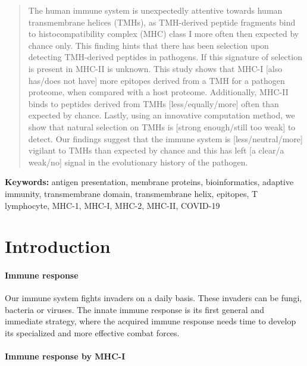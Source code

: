 \begin{abstract}

The human immune system is unexpectedly attentive towards
human transmembrane helices (TMHs), as TMH-derived peptide fragments
bind to histocompatibility complex (MHC) class I more often then expected
by chance only.
This finding hints that there has been selection upon detecting TMH-derived
peptides in pathogens.
If this signature of selection is present in MHC-II is unknown.
This study shows that MHC-I [also has/does not have] more
epitopes derived from a TMH for a pathogen proteome, when compared with
a host proteome.
Additionally, MHC-II binds to peptides derived from TMHs 
[less/equally/more] often than expected by chance.
Lastly, using an innovative computation method, 
we show that natural selection on TMHs is [strong enough/still too weak]
to detect.
Our findings suggest that the immune system is [less/neutral/more]
vigilant to TMHs than expected by chance and this has 
left [a clear/a weak/no]
signal in the evolutionary history of the pathogen.

\end{abstract}

{\bf Keywords:} antigen presentation, membrane proteins, bioinformatics, 
adaptive immunity, transmembrane domain, transmembrane helix, 
epitopes, T lymphocyte, MHC-1, MHC-I, MHC-2, MHC-II, COVID-19

\section{Introduction}

\paragraph{Immune response}

Our immune system fights invaders on a daily basis.
These invaders can be fungi, bacteria or viruses.
The innate immune response is its first general 
and immediate strategy, where the acquired immune response
needs time to develop its specialized and more effective
combat forces.

\paragraph{Immune response by MHC-I}

